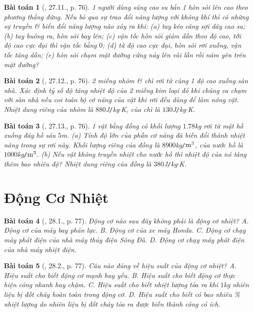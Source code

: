 \documentclass{article}
\newtheorem{baitoan}{Bài toán}
\begin{document}
\begin{baitoan}[\cite{SBT_Vat_Ly_8}, 27.11., p. 76]
	1 người dùng súng cao su bắn 1 hòn sỏi lên cao theo phương thẳng đứng. Nếu bỏ qua sự trao đổi năng lượng với không khí thì có những sự truyền \& biến đổi năng lượng nào xảy ra khi: (a) tay kéo căng sợi dây cao su; (b) tay buông ra, hòn sỏi bay lên; (c) vận tốc hòn sỏi giảm dần theo độ cao, tới độ cao cực đại thì vận tốc bằng $0$; (d) từ độ cao cực đại, hòn sỏi rơi xuống, vận tốc tăng dần; (e) hòn sỏi chạm mặt đường cứng nảy lên vài lần rồi năm yên trên mặt đường?
\end{baitoan}

\begin{baitoan}[\cite{SBT_Vat_Ly_8}, 27.12., p. 76]
	2 miếng nhôm \& chì rơi từ cùng 1 độ cao xuống sàn nhà. Xác định tỷ số độ tăng nhiệt độ của 2 miếng kim loại đó khi chúng va chạm với sàn nhà nếu coi toàn bộ cơ năng của vật khi rơi đều dùng để làm nóng vật. Nhiệt dung riêng của nhôm là $880$\emph{J\texttt{/}kg$\cdot$K}, của chì là $130$\emph{J\texttt{/}kg$\cdot$K}.
\end{baitoan}

\begin{baitoan}[\cite{SBT_Vat_Ly_8}, 27.13., p. 76]
	1 vật bằng đồng có khối lượng $1.78$\emph{kg} rơi từ mặt hồ xuống đáy hồ sâu $5$\emph{m}. (a) Tính độ lớn của phần cơ năng đã biến đổi thành nhiệt năng trong sự rơi này. Khối lượng riêng của đồng là $8900$\emph{kg\texttt{/}$\rm m^3$}, của nước hồ là $1000$\emph{kg\texttt{/}$\rm m^3$}. (b) Nếu vật không truyền nhiệt cho nước hồ thì nhiệt độ của nó tăng thêm bao nhiêu độ? Nhiệt dung riêng của đồng là $380$\emph{J\texttt{/}kg$\cdot$K}.
\end{baitoan}


\section{Động Cơ Nhiệt}

\begin{baitoan}[\cite{SBT_Vat_Ly_8}, 28.1., p. 77]
	Động cơ nào sau đây không phải là động cơ nhiệt? {\sf A.} Động cơ của máy bay phản lực. {\sf B.} Động cơ của xe máy Honda. {\sf C.} Động cơ chạy máy phát điện của nhà máy thủy điện Sông Đà. {\sf D.} Động cơ chạy máy phát điện của nhà máy nhiệt điện.
\end{baitoan}

\begin{baitoan}[\cite{SBT_Vat_Ly_8}, 28.2., p. 77]
	Câu nào đúng về hiệu suất của động cơ nhiệt? {\sf A.} Hiệu suất cho biết động cơ mạnh hay yếu. {\sf B.} Hiệu suất cho biết động cơ thực hiện công nhanh hay chậm. {\sf C.} Hiệu suất cho biết nhiệt lượng tỏa ra khi $1$\emph{kg} nhiên liệu bị đốt cháy hoàn toàn trong động cơ. {\sf D.} Hiệu suất cho biết có bao nhiêu \% nhiệt lượng do nhiên liệu bị đốt cháy tỏa ra được biến thành công có ích.
\end{baitoan}
\end{document}
